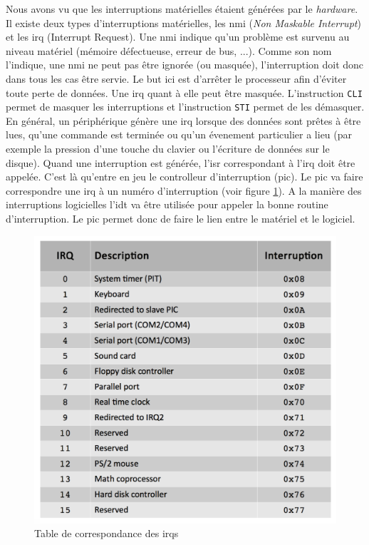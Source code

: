 Nous avons vu que les interruptions matérielles étaient générées par le \textit{hardware}.
Il existe deux types d'interruptions matérielles, les \acrshort{nmi} (\textit{Non Maskable
Interrupt}) et les \acrshort{irq} (Interrupt Request). Une \acrshort{nmi} indique
qu'un problème est survenu au niveau matériel (mémoire défectueuse, erreur de bus, ...).
Comme son nom l'indique, une \acrshort{nmi} ne peut pas être ignorée (ou masquée),
l'interruption doit donc dans tous les cas être servie. Le but ici est d'arrêter
le processeur afin d'éviter toute perte de données.\cite{ref42} Une \acrshort{irq}
quant à elle peut être masquée. L'instruction \texttt{CLI} permet de masquer
les interruptions et l'instruction \texttt{STI} permet de les démasquer.
En général, un périphérique génère une \acrshort{irq} lorsque des données sont
prêtes à être lues, qu'une commande est terminée ou qu'un évenement particulier
a lieu (par exemple la pression d'une touche du clavier ou l'écriture de données
sur le disque). Quand une interruption est générée, l'\acrshort{isr} correspondant
à l'\acrshort{irq} doit être appelée. C'est là qu'entre en jeu le controlleur
d'interruption (\acrshort{pic}). Le \acrshort{pic} va faire correspondre une
\acrshort{irq} à un numéro d'interruption (voir figure \ref{irqs}). A la manière des
interruptions logicielles l'\acrshort{idt} va être utilisée pour appeler la bonne
routine d'interruption. Le \acrshort{pic} permet donc de faire le lien entre le
matériel et le logiciel. \\

\begin{figure}[!h]
  \centering
  \includegraphics[scale=0.5]{images/irqs.png}
  \caption{Table de correspondance des \acrshort{irq}s}
  \label{irqs}
\end{figure}

